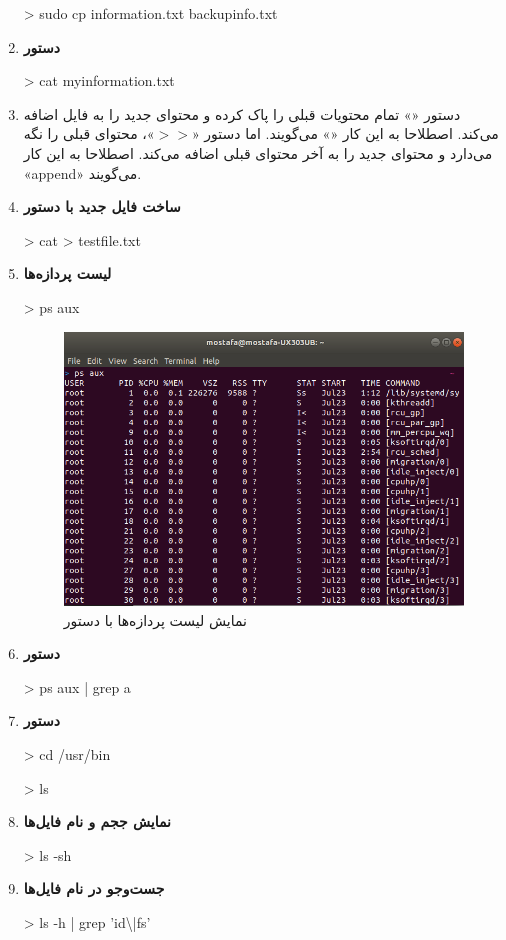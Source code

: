 \begin{enumerate}
		\begin{code}
			> sudo cp information.txt backupinfo.txt
		\end{code}
	\item  
		\textbf{دستور }
		\begin{code}
			> cat myinformation.txt
		\end{code}
	\item دستور «\lr{>}» تمام محتویات قبلی را پاک کرده و محتوای جدید را به فایل اضافه می‌کند. اصطلاحا به این کار «» می‌گویند.
	 اما دستور «$>>$»، محتوای قبلی را نگه می‌دارد و محتوای جدید را به آخر محتوای قبلی اضافه می‌کند. اصطلاحا به این کار «append» می‌گویند.
	\item 
		\textbf{ساخت فایل جدید با دستور }
		\begin{code}
			> cat > testfile.txt
		\end{code}
	\item 
		\textbf{لیست پردازه‌ها}
		\begin{code}
			> ps aux
		\end{code}
		\begin{figure}[!htbp]
			\includegraphics[width=\linewidth]{9.png}
			\caption{نمایش لیست پردازه‌ها با دستور }
		\end{figure}
	\item 
		\textbf{دستور }
		\begin{code}
			> ps aux | grep a
		\end{code}
	
	\item 
		\textbf{دستور }
		\begin{code}
			> cd /usr/bin
			
			> ls
		\end{code}
	
	\item 
		\textbf{نمایش ججم و نام فایل‌ها}
		\begin{code}
			> ls -sh
		\end{code}
	\item 
		\textbf{جست‌وجو در نام فایل‌ها}
		\begin{code}
			> ls -h | grep 'id\textbackslash|fs'
		\end{code}
 
			
\end{enumerate}